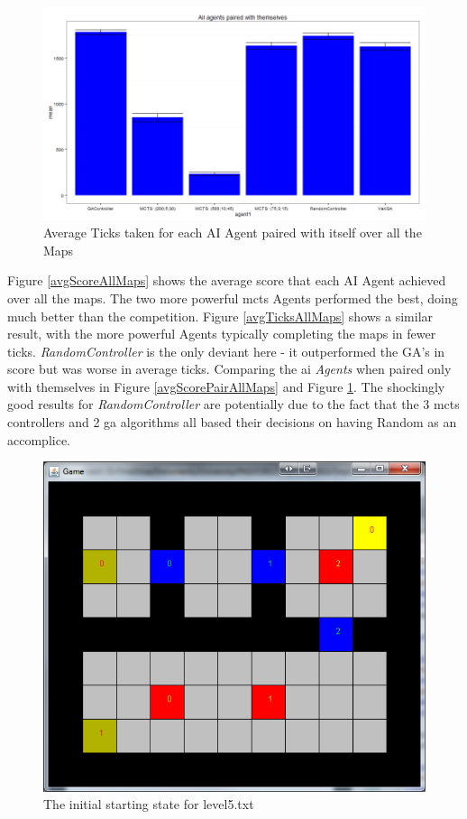 \documentclass{IEEEtran}
\begin{document}
\begin{figure}[ht]
\centering
\includegraphics[width=\linewidth]{ticks-samepairs}
\caption{Average Ticks taken for each AI Agent paired with itself over all the Maps}
\label{avgTicksPairAllMaps}
\end{figure}

Figure \ref{avgScoreAllMaps} shows the average score that each AI Agent achieved over all the maps. The two more powerful \gls{mcts} Agents performed the best, doing much better than the competition. Figure \ref{avgTicksAllMaps} shows a similar result, with the more powerful Agents typically completing the maps in fewer ticks. \emph{RandomController} is the only deviant here - it outperformed the GA's in score but was worse in average ticks. Comparing the \gls{ai} \emph{Agents} when paired only with themselves in Figure \ref{avgScorePairAllMaps} and Figure \ref{avgTicksPairAllMaps}. The shockingly good results for \emph{RandomController} are potentially due to the fact that the 3 \gls{mcts} controllers and 2 \gls{ga} algorithms all based their decisions on having Random as an accomplice.

\pagebreak
\begin{figure}[ht]
\centering
\includegraphics[scale=0.5]{level5}
\caption{The initial starting state for level5.txt}
\label{Level5State}
\end{figure}
\end{document}
